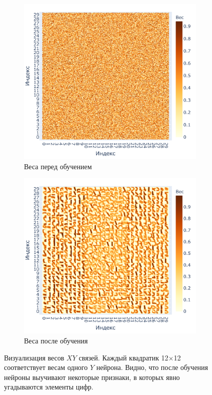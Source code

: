 \documentclass[a4paper]{article}
\begin{document}
\begin{figure}[H]
\centering
\begin{subfigure}{0.45\textwidth}
    \includegraphics[width=\textwidth,keepaspectratio=true]{weights_XY_untrained_ru.pdf}
    \caption{Веса перед обучением}
\end{subfigure}
\begin{subfigure}{0.45\textwidth}  \label{weights_XY}
    \includegraphics[width=\textwidth,keepaspectratio=true]{weights_XY_ru.pdf}
    \caption{Веса после обучения}
\end{subfigure}
\caption{Визуализация весов $XY$ связей. Каждый квадратик 12$\times$12 соответствует весам одного $Y$ нейрона. Видно, что после обучения нейроны выучивают некоторые признаки, в которых явно угадываются элементы цифр.}
\end{figure}
\end{document}
